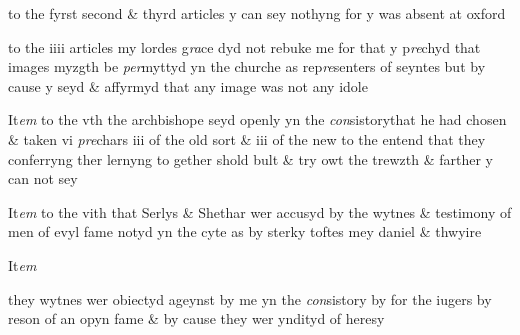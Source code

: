 \documentclass[12pt, a4paper]{book}
\begin{document}
            		
		\ifthenelse{\isodd{\thepage}}
		{\reversemarginpar}
		{\normalmarginpar}
		to the fyrst second \& thyrd articles y can sey nothyng for  y was absent at oxford
            		
            			
				\marginpar[\vspace{0.5cm}{\textcolor{Gray}{4}}]{}
			
            			
		\ifthenelse{\isodd{\thepage}}
		{\reversemarginpar}
		{\normalmarginpar}
		to the iiii articles my lordes g\textit{ra}ce dyd not rebuke me for that y p\textit{re}chyd that images myzgth be \textit{per}myttyd yn the churche as rep\textit{re}senters of seyntes but by cause y seyd \& affyrmyd that any image was not any idole
            		
            		
            			
				\marginpar[\vspace{0.5cm}{\textcolor{Gray}{4}}]{}
			
            			
		\ifthenelse{\isodd{\thepage}}
		{\reversemarginpar}
		{\normalmarginpar}
		It\textit{em} to the vth the archbishope seyd openly yn the \textit{con}sistorythat he had chosen  \& taken vi \textit{pre}chars iii of the old sort \& iii of the new to the entend that they conferryng ther lernyng to gether shold bult \& try owt the trewzth \& farther y can not sey
            		
				\marginpar[\vspace{0.5cm}{\textcolor{Gray}{6}}]{}
			
            			
		\ifthenelse{\isodd{\thepage}}
		{\reversemarginpar}
		{\normalmarginpar}
		It\textit{em} to the vith that Serlys \& Shethar wer accusyd by the wytnes \& testimony of men of evyl fame notyd yn the cyte  as by sterky toftes mey daniel \& thwyire
            		
            		
            			
				\marginpar[\vspace{0.5cm}{\textcolor{Gray}{8}}]{}
			 It\textit{em}
            			
		\ifthenelse{\isodd{\thepage}}
		{\reversemarginpar}
		{\normalmarginpar}
		they wytnes wer obiectyd ageynst by me yn the \textit{con}sistory by for the iugers by reson of an opyn fame \& by cause they wer yndityd of heresy
            		
            		
            			
				\marginpar[\vspace{0.5cm}{\textcolor{Gray}{7}}]{}
			
\end{document}

